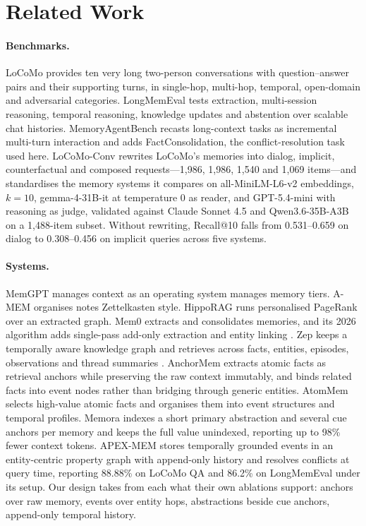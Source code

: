 \documentclass[11pt]{article}
\begin{document}
\section{Related Work}

\paragraph{Benchmarks.} LoCoMo \cite{locomo} provides ten very long
two-person conversations with question--answer pairs and their supporting
turns, in single-hop, multi-hop, temporal, open-domain and adversarial
categories. LongMemEval \cite{longmemeval} tests extraction, multi-session
reasoning, temporal reasoning, knowledge updates and abstention over
scalable chat histories. MemoryAgentBench \cite{mab} recasts long-context
tasks as incremental multi-turn interaction and adds FactConsolidation, the
conflict-resolution task used here. LoCoMo-Conv \cite{locomoconv} rewrites
LoCoMo's memories into dialog, implicit, counterfactual and composed
requests---1,986, 1,986, 1,540 and 1,069 items---and standardises the
memory systems it compares on all-MiniLM-L6-v2 embeddings, $k=10$,
gemma-4-31B-it at temperature 0 as reader, and GPT-5.4-mini with reasoning
as judge, validated against Claude Sonnet 4.5 and Qwen3.6-35B-A3B on a
1,488-item subset. Without rewriting, Recall@10 falls from 0.531--0.659 on
dialog to 0.308--0.456 on implicit queries across five systems.

\paragraph{Systems.} MemGPT \cite{memgpt} manages context as an operating
system manages memory tiers. A-MEM \cite{amem} organises notes Zettelkasten
style. HippoRAG \cite{hipporag} runs personalised PageRank over an extracted
graph. Mem0 \cite{mem0} extracts and consolidates memories, and its 2026
algorithm adds single-pass add-only extraction and entity linking
\cite{mem0blog}. Zep \cite{zep} keeps a temporally aware knowledge graph and
retrieves across facts, entities, episodes, observations and thread
summaries \cite{zepresearch}. AnchorMem \cite{anchormem} extracts atomic
facts as retrieval anchors while preserving the raw context immutably, and
binds related facts into event nodes rather than bridging through generic
entities. AtomMem \cite{atommem} selects high-value atomic facts and
organises them into event structures and temporal profiles. Memora
\cite{memora} indexes a short primary abstraction and several cue anchors
per memory and keeps the full value unindexed, reporting up to 98\% fewer
context tokens. APEX-MEM \cite{apexmem} stores temporally grounded events in
an entity-centric property graph with append-only history and resolves
conflicts at query time, reporting 88.88\% on LoCoMo QA and 86.2\% on
LongMemEval under its setup. Our design takes from each what their own
ablations support: anchors over raw memory, events over entity hops,
abstractions beside cue anchors, append-only temporal history.
\end{document}
